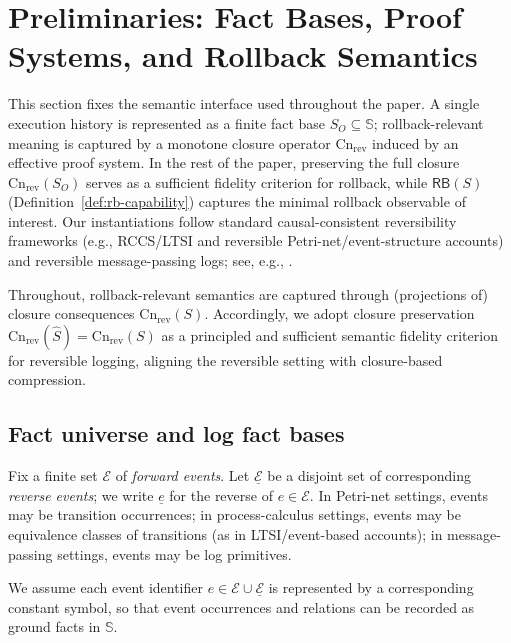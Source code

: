\documentclass[twoside]{article}
\newcommand{\Cn}{\mathrm{Cn}}
\newcommand{\1}{\mathbf{1}}
\begin{document}
\section{Preliminaries: Fact Bases, Proof Systems, and Rollback Semantics}
\label{sec:prelim}

This section fixes the semantic interface used throughout the paper.
A single execution history is represented as a finite fact base \(S_O\subseteq\mathbb{S}\);
rollback-relevant meaning is captured by a monotone closure operator \(\Cn_{\mathrm{rev}}\)
induced by an effective proof system.
In the rest of the paper, preserving the full closure \(\Cn_{\mathrm{rev}}(S_O)\) serves as a sufficient fidelity criterion for rollback,
while \(\mathsf{RB}(S)\) (Definition~\ref{def:rb-capability}) captures the minimal rollback observable of interest.
Our instantiations follow standard causal-consistent reversibility frameworks (e.g., RCCS/LTSI and reversible Petri-net/event-structure accounts)
and reversible message-passing logs; see, e.g., \cite{lanese2024axiomatic,melgratti2024reversible,oguchi2025revmigo}.

Throughout, rollback-relevant semantics are captured through (projections of)
closure consequences \(\Cn_{\mathrm{rev}}(S)\).
Accordingly, we adopt closure preservation
\(\Cn_{\mathrm{rev}}(\hat{S})=\Cn_{\mathrm{rev}}(S)\) as a principled and
sufficient semantic fidelity criterion for reversible logging, aligning the
reversible setting with closure-based compression.

\subsection{Fact universe and log fact bases}
\label{sec:fact-universe}

Fix a finite set \(\mathcal{E}\) of \emph{forward events}. Let \(\underline{\mathcal{E}}\) be a disjoint set of corresponding
\emph{reverse events}; we write \(\underline{e}\) for the reverse of \(e\in\mathcal{E}\).
In Petri-net settings, events may be transition occurrences; in process-calculus settings, events may be equivalence classes of
transitions (as in LTSI/event-based accounts); in message-passing settings, events may be log primitives.

We assume each event identifier \(e\in \mathcal{E}\cup \underline{\mathcal{E}}\) is represented by a corresponding constant symbol,
so that event occurrences and relations can be recorded as ground facts in \(\mathbb{S}\).
\end{document}
